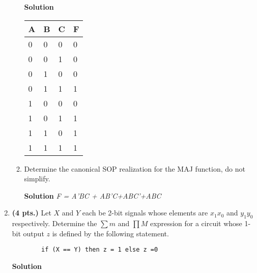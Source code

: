 \begin{enumerate}
\begin{enumerate}
                \begin{onlysolution}  \textbf{Solution} \itshape

                    \begin{tabular}{l|l|l||l} \\
                        A & B & C &  F \\ \hline
                        0 & 0 & 0 &  0 \\ \hline
                        0 & 0 & 1 &  0 \\ \hline
                        0 & 1 & 0 &  0 \\ \hline
                        0 & 1 & 1 &  1 \\ \hline
                        1 & 0 & 0 &  0 \\ \hline
                        1 & 0 & 1 &  1 \\ \hline
                        1 & 1 & 0 &  1 \\ \hline
                        1 & 1 & 1 &  1 \\
                    \end{tabular}
                \end{onlysolution}

            \item Determine the canonical SOP realization for the MAJ
                function, do not simplify.

                \begin{onlysolution}  \textbf{Solution} \itshape
                    F = A'BC + AB'C+ABC'+ABC
                \end{onlysolution}
        \end{enumerate}

    \item \textbf{ (4 pts.)} Let $X$ and $Y$ each be 2-bit signals whose
        elements are $x_1 x_0$ and $y_1 y_0$ respectively.  Determine the
        $\sum m$ and $\prod M$ expression for a circuit whose 1-bit
        output $z$ is defined by the following statement.
\begin{verbatim}
        if (X == Y) then z = 1 else z =0
\end{verbatim}

        \begin{onlysolution}  \textbf{Solution} \itshape


\end{onlysolution}
\end{enumerate}
